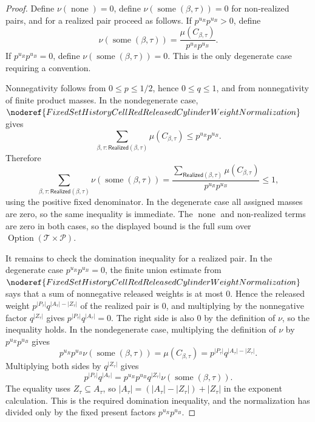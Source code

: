 \begin{proof}
Define \(\nu(\operatorname{none})=0\), define
\(\nu(\operatorname{some}(\beta,\tau))=0\) for non-realized pairs, and for a
realized pair proceed as follows.  If \(p^{u_R}p^{u_B}>0\), define
\[
\nu(\operatorname{some}(\beta,\tau))
=
\frac{\mu(C_{\beta,\tau})}{p^{u_R}p^{u_B}}.
\]
If \(p^{u_R}p^{u_B}=0\), define
\(\nu(\operatorname{some}(\beta,\tau))=0\).  This is the only degenerate
case requiring a convention.

Nonnegativity follows from \(0\le p\le 1/2\), hence \(0\le q\le 1\), and
from nonnegativity of finite product masses.  In the nondegenerate case,
\(\noderef{FixedSetHistoryCellRedReleasedCylinderWeightNormalization}\)
gives
\[
\sum_{\beta,\tau:\mathsf{Realized}(\beta,\tau)}
  \mu(C_{\beta,\tau})
\le p^{u_R}p^{u_B}.
\]
Therefore
\[
\sum_{\beta,\tau:\mathsf{Realized}(\beta,\tau)}
  \nu(\operatorname{some}(\beta,\tau))
=
\frac{\sum_{\mathsf{Realized}(\beta,\tau)}\mu(C_{\beta,\tau})}
     {p^{u_R}p^{u_B}}
\le 1,
\]
using the positive fixed denominator.  In the degenerate case all assigned
masses are zero, so the same inequality is immediate.  The
\(\operatorname{none}\) and non-realized terms are zero in both cases, so
the displayed bound is the full sum over
\(\operatorname{Option}(\mathcal T\times\mathcal P)\).

It remains to check the domination inequality for a realized pair.  In the
degenerate case \(p^{u_R}p^{u_B}=0\), the finite union estimate from
\(\noderef{FixedSetHistoryCellRedReleasedCylinderWeightNormalization}\)
says that a sum of nonnegative released weights is at most \(0\).  Hence the
released weight
\(p^{|P_\tau|}q^{|A_\tau|-|Z_\tau|}\) of the realized pair is \(0\), and
multiplying by the nonnegative factor \(q^{|Z_\tau|}\) gives
\(p^{|P_\tau|}q^{|A_\tau|}=0\).  The right side is also \(0\) by the
definition of \(\nu\), so the inequality holds.  In the nondegenerate case,
multiplying the definition of \(\nu\) by \(p^{u_R}p^{u_B}\) gives
\[
p^{u_R}p^{u_B}\nu(\operatorname{some}(\beta,\tau))
=\mu(C_{\beta,\tau})
=p^{|P_\tau|}q^{|A_\tau|-|Z_\tau|}.
\]
Multiplying both sides by \(q^{|Z_\tau|}\) gives
\[
p^{|P_\tau|}q^{|A_\tau|}
=
p^{u_R}p^{u_B}q^{|Z_\tau|}
  \nu(\operatorname{some}(\beta,\tau)).
\]
The equality uses \(Z_\tau\subseteq A_\tau\), so
\(|A_\tau|=(|A_\tau|-|Z_\tau|)+|Z_\tau|\) in the exponent calculation.  This
is the required domination inequality, and the normalization has divided only
by the fixed present factors \(p^{u_R}p^{u_B}\).
\end{proof}

